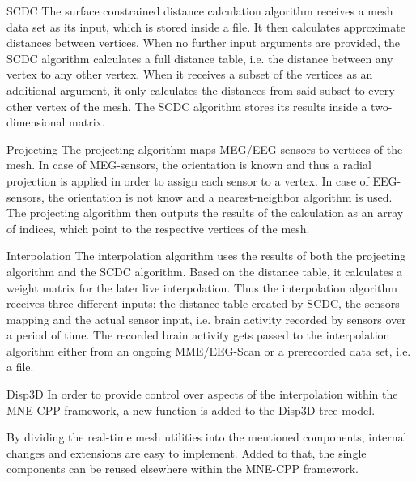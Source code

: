 \documentclass[a4paper, 11pt, english, fleqn]{article}
\begin{document}
\begin{aims}
	
	\item[SCDC] 
	The surface constrained distance calculation algorithm receives a mesh data set as its input, which is stored inside a file. It then calculates approximate distances between vertices. When no further input arguments are provided, the SCDC algorithm calculates a full distance table, i.e. the distance between any vertex to any other vertex.
	When it receives a subset of the vertices as an additional argument, it only calculates the distances from said subset to every other vertex of the mesh. The SCDC algorithm stores its results inside a two-dimensional matrix.
	
	\item[Projecting]
	The projecting algorithm maps MEG/EEG-sensors to vertices of the mesh. In case of MEG-sensors, the orientation is known and thus a radial projection is applied in order to assign each sensor to a vertex. In case of EEG-sensors, the orientation is not know and a nearest-neighbor algorithm is used.
	The projecting algorithm then outputs the results of the calculation as an array of indices, which point to the respective vertices of the mesh.
	
	\item[Interpolation]
	The interpolation algorithm uses the results of both the projecting algorithm and the SCDC algorithm.
	Based on the distance table, it calculates a weight matrix for the later live interpolation. 
	Thus the interpolation algorithm receives three different inputs: the distance table created by SCDC, the sensors mapping and the actual sensor input, i.e. brain activity recorded by sensors over a period of time.
	The recorded brain activity gets passed to the interpolation algorithm either from an ongoing MME/EEG-Scan or a prerecorded data set, i.e. a file. 
	
	\item[Disp3D]
	In order to provide control over aspects of the interpolation within the MNE-CPP framework, a new function is added to the Disp3D tree model.
		
\end{aims}

By dividing the real-time mesh utilities into the mentioned components, internal changes and extensions are easy to implement. Added to that, the single components can be reused elsewhere within the MNE-CPP framework.

\clearpage
\end{document}
